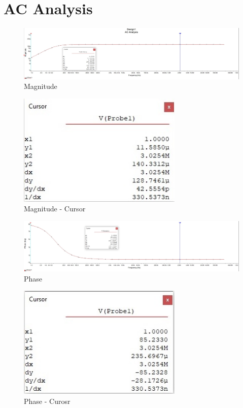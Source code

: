 \documentclass[a4paper,twoside]{report}
\begin{document}
	\section*{AC Analysis}
		\begin{center}
			\begin{figure}[!h]
				\includegraphics[width=\textwidth]{AC-Magnitude-graph.jpg}
				\caption{Magnitude}
				\label{fig:ac-magnitude}
			\end{figure}
			\begin{figure}[!h]
				\includegraphics[width=0.7\textwidth]{AC-Magnitude-cursor.jpg}
				\caption{Magnitude - Cursor}
				\label{fig:ac-magnitude-cursor}
			\end{figure}
		\end{center}

		\begin{center}
			\begin{figure}[!h]
				\includegraphics[width=\textwidth]{AC-Phase-graph.jpg}
				\caption{Phase}
				\label{fig:ac-Phase}
			\end{figure}
			\begin{figure}[!h]
				\includegraphics[width=0.7\textwidth]{AC-Phase-cursor.jpg}
				\caption{Phase - Curosr}
				\label{fig:ac-phase-cursor}
			\end{figure}
		\end{center}
\end{document}

